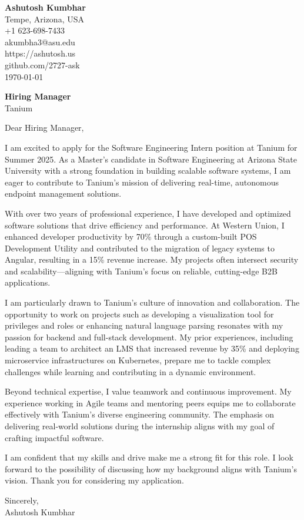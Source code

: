 \documentclass[11pt]{article}
\begin{document}
\begin{flushleft}
\textbf{Ashutosh Kumbhar} \\
Tempe, Arizona, USA \\
+1 623-698-7433 \\
akumbha3@asu.edu \\
https://ashutosh.us \\
github.com/2727-ask \\
\today
\end{flushleft}

\vspace{0.5em}

\textbf{Hiring Manager} \\
Tanium \\

\vspace{1em}

Dear Hiring Manager,  

I am excited to apply for the Software Engineering Intern position at Tanium for Summer 2025. As a Master’s candidate in Software Engineering at Arizona State University with a strong foundation in building scalable software systems, I am eager to contribute to Tanium's mission of delivering real-time, autonomous endpoint management solutions.  

With over two years of professional experience, I have developed and optimized software solutions that drive efficiency and performance. At Western Union, I enhanced developer productivity by 70\% through a custom-built POS Development Utility and contributed to the migration of legacy systems to Angular, resulting in a 15\% revenue increase. My projects often intersect security and scalability—aligning with Tanium’s focus on reliable, cutting-edge B2B applications.  

I am particularly drawn to Tanium’s culture of innovation and collaboration. The opportunity to work on projects such as developing a visualization tool for privileges and roles or enhancing natural language parsing resonates with my passion for backend and full-stack development. My prior experiences, including leading a team to architect an LMS that increased revenue by 35\% and deploying microservice infrastructures on Kubernetes, prepare me to tackle complex challenges while learning and contributing in a dynamic environment.  

Beyond technical expertise, I value teamwork and continuous improvement. My experience working in Agile teams and mentoring peers equips me to collaborate effectively with Tanium’s diverse engineering community. The emphasis on delivering real-world solutions during the internship aligns with my goal of crafting impactful software.  

I am confident that my skills and drive make me a strong fit for this role. I look forward to the possibility of discussing how my background aligns with Tanium’s vision. Thank you for considering my application.  

Sincerely, \\
Ashutosh Kumbhar  
\end{document}
